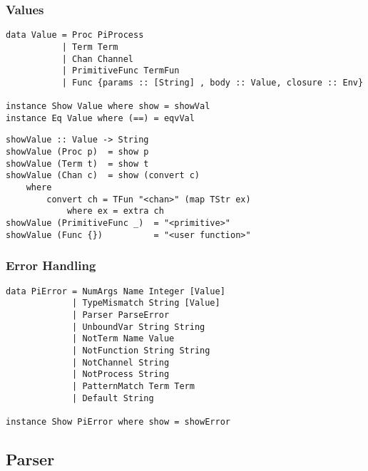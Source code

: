 \subsubsection{Values}
\begin{verbatim}
data Value = Proc PiProcess 
           | Term Term
           | Chan Channel
           | PrimitiveFunc TermFun
           | Func {params :: [String] , body :: Value, closure :: Env}

instance Show Value where show = showVal
instance Eq Value where (==) = eqvVal
\end{verbatim}
\begin{verbatim}
showValue :: Value -> String
showValue (Proc p)  = show p
showValue (Term t)  = show t
showValue (Chan c)  = show (convert c)
    where 
        convert ch = TFun "<chan>" (map TStr ex) 
            where ex = extra ch
showValue (PrimitiveFunc _)  = "<primitive>" 
showValue (Func {})          = "<user function>"  
\end{verbatim}
\subsubsection{Error Handling}
\begin{verbatim}
data PiError = NumArgs Name Integer [Value]
             | TypeMismatch String [Value]
             | Parser ParseError
             | UnboundVar String String
             | NotTerm Name Value
             | NotFunction String String
             | NotChannel String
             | NotProcess String
             | PatternMatch Term Term
             | Default String

instance Show PiError where show = showError
\end{verbatim}


\subsection{Parser}
\label{subsec:parser}
